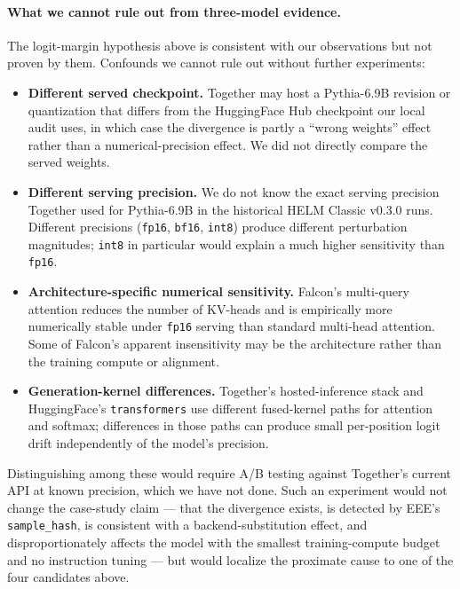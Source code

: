 \paragraph{What we cannot rule out from three-model evidence.}
The logit-margin hypothesis above is consistent with our observations
  but not proven by them.
Confounds we cannot rule out without further experiments:
\begin{itemize}
  \item \textbf{Different served checkpoint.}
        Together may host a Pythia-6.9B revision or quantization that
        differs from the HuggingFace Hub checkpoint our local audit
        uses, in which case the divergence is partly a ``wrong
        weights'' effect rather than a numerical-precision effect.
        We did not directly compare the served weights.
  \item \textbf{Different serving precision.}
        We do not know the exact serving precision Together used for
        Pythia-6.9B in the historical HELM Classic v0.3.0 runs.
        Different precisions (\texttt{fp16}, \texttt{bf16}, \texttt{int8})
        produce different perturbation magnitudes; \texttt{int8} in
        particular would explain a much higher sensitivity than
        \texttt{fp16}.
  \item \textbf{Architecture-specific numerical sensitivity.}
        Falcon's multi-query attention reduces the number of KV-heads
        and is empirically more numerically stable under \texttt{fp16}
        serving than standard multi-head attention.
        Some of Falcon's apparent insensitivity may be the architecture
        rather than the training compute or alignment.
  \item \textbf{Generation-kernel differences.}
        Together's hosted-inference stack and HuggingFace's
        \texttt{transformers} use different fused-kernel paths for
        attention and softmax; differences in those paths can produce
        small per-position logit drift independently of the model's
        precision.
\end{itemize}
Distinguishing among these would require A/B testing against
  Together's current API at known precision, which we have not done.
Such an experiment would not change the case-study claim — that the
  divergence exists, is detected by EEE's \texttt{sample\_hash}, is
  consistent with a backend-substitution effect, and disproportionately
  affects the model with the smallest training-compute budget and no
  instruction tuning — but would localize the proximate cause to one of
  the four candidates above.

